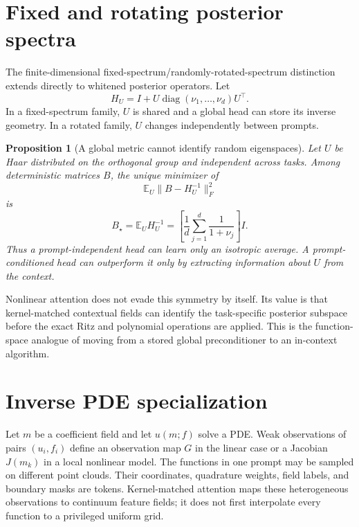 \documentclass[11pt,a4paper]{article}
\numberwithin{equation}{section}
\newtheorem{proposition}[theorem]{Proposition}
\theoremstyle{definition}
\theoremstyle{remark}
\newcommand{\E}{\mathbb E}
\newcommand{\diag}{\operatorname{diag}}
\begin{document}
\section{Fixed and rotating posterior spectra}
\label{sec:fs-rrs}

The finite-dimensional fixed-spectrum/randomly-rotated-spectrum distinction
extends directly to whitened posterior operators.  Let
\begin{equation}
 H_U=I+U\diag(\nu_1,\ldots,\nu_d)U^\top.
 \label{eq:rotated-posterior}
\end{equation}
In a fixed-spectrum family, $U$ is shared and a global head can store its
inverse geometry.  In a rotated family, $U$ changes independently between
prompts.

\begin{proposition}[A global metric cannot identify random eigenspaces]
\label{prop:random-rotations}
Let $U$ be Haar distributed on the orthogonal group and independent across
tasks.  Among deterministic matrices $B$, the unique minimizer of
\begin{equation}
 \E_U\|B-H_U^{-1}\|_F^2
 \label{eq:global-inverse-risk}
\end{equation}
is
\begin{equation}
 B_\star=\E_UH_U^{-1}
 =\left[\frac1d\sum_{j=1}^d\frac{1}{1+\nu_j}\right]I.
 \label{eq:isotropic-global-head}
\end{equation}
Thus a prompt-independent head can learn only an isotropic average.  A
prompt-conditioned head can outperform it only by extracting information
about $U$ from the context.
\end{proposition}

Nonlinear attention does not evade this symmetry by itself.  Its value is that
kernel-matched contextual fields can identify the task-specific posterior
subspace before the exact Ritz and polynomial operations are applied.  This
is the function-space analogue of moving from a stored global preconditioner
to an in-context algorithm.

\section{Inverse PDE specialization}
\label{sec:pde}

Let $m$ be a coefficient field and let $u(m;f)$ solve a PDE.  Weak observations
of pairs $(u_i,f_i)$ define an observation map $G$ in the linear case or a
Jacobian $J(m_k)$ in a local nonlinear model.  The functions in one prompt may
be sampled on different point clouds.  Their coordinates, quadrature weights,
field labels, and boundary masks are tokens.  Kernel-matched attention maps
these heterogeneous observations to continuum feature fields; it does not
first interpolate every function to a privileged uniform grid.
\end{document}
